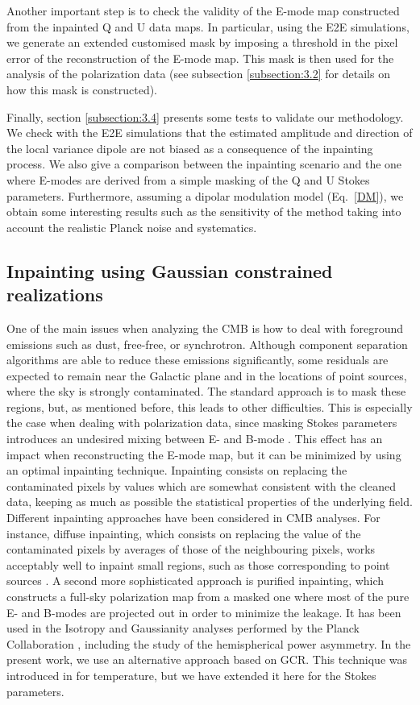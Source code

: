 Another important step is to check the validity of the E-mode map constructed from the inpainted Q and U data maps. In particular, using the E2E simulations, we generate an extended customised mask by imposing a threshold in the pixel error of the reconstruction of the E-mode map. This mask is then used for the analysis of the polarization data (see subsection \ref{subsection:3.2} for details on how this mask is constructed).

Finally, section \ref{subsection:3.4} presents some tests to validate our methodology.
We check with the E2E simulations that the estimated amplitude and direction of the local variance dipole are not biased as a consequence of the inpainting process. We also give a comparison between the inpainting scenario and the one where E-modes are derived from a simple masking of the Q and U Stokes parameters. Furthermore, assuming a dipolar modulation model (Eq.~\ref{DM}), we obtain some interesting results such as 
the sensitivity of the method taking into account the realistic Planck noise and systematics.

\subsection{Inpainting using Gaussian constrained realizations}\label{subsection:3.1}

One of the main issues when analyzing the CMB is how to deal with foreground emissions such as dust, free-free, or synchrotron. Although component separation algorithms are able to reduce these emissions significantly, some residuals are expected to remain near the Galactic plane and in the
locations of point sources, where the sky is strongly contaminated. 
The standard approach is to mask these regions, 
but, as mentioned before, this leads to other  difficulties.
This is especially the case when dealing with polarization data,
since masking Stokes parameters introduces an undesired mixing between E- and B-mode \cite{Tegmark:2001zv, Lewis:2003an}. This effect has an impact 
when reconstructing the E-mode map, but it can be minimized by using an optimal inpainting technique. Inpainting consists on replacing the contaminated pixels by values which are somewhat consistent with the cleaned data, keeping as much as possible the statistical properties of the underlying field.
Different inpainting approaches have been considered in CMB analyses. For instance, 
diffuse inpainting, which consists on replacing the value of the contaminated pixels by averages of those of the neighbouring pixels, works acceptably well to inpaint small regions, such as those 
corresponding to point sources \cite{Planck:2018yye}. A second more sophisticated approach is purified inpainting, which constructs a full-sky polarization map from a masked one where most of the pure E- and B-modes are projected out in order to minimize the leakage. It has been used in the Isotropy and Gaussianity analyses performed by the Planck Collaboration \citep{Planck:2019evm}, including the study of the hemispherical power asymmetry.
In the present work, we use an alternative approach 
based on GCR. This technique was introduced in \cite{Marcos-Caballero:2019jqj} for temperature, but we have extended it here for the Stokes parameters.

